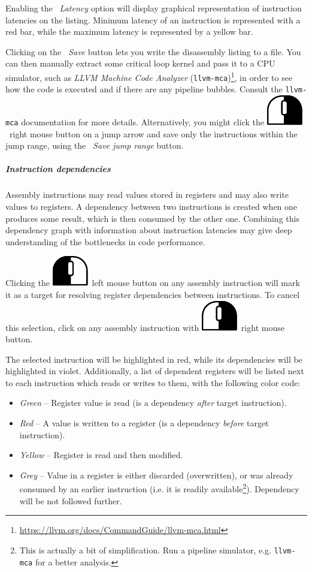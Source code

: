 \documentclass[hidelinks,titlepage,a4paper]{article}
\newcommand{\LMB}{\includegraphics[height=.8\baselineskip]{icons/lmb}}
\newcommand{\RMB}{\includegraphics[height=.8\baselineskip]{icons/rmb}}
\begin{document}
Enabling the \emph{\faTruckLoading{}~Latency} option will display graphical representation of instruction latencies on the listing. Minimum latency of an instruction is represented with a red bar, while the maximum latency is represented by a yellow bar.

Clicking on the \emph{\faFileImport{}~Save} button lets you write the disassembly listing to a file. You can then manually extract some critical loop kernel and pass it to a CPU simulator, such as \emph{LLVM Machine Code Analyzer} (\texttt{llvm-mca})\footnote{\url{https://llvm.org/docs/CommandGuide/llvm-mca.html}}, in order to see how the code is executed and if there are any pipeline bubbles. Consult the \texttt{llvm-mca} documentation for more details. Alternatively, you might click the \RMB{}~right mouse button on a jump arrow and save only the instructions within the jump range, using the \emph{\faFileImport{}~Save jump range} button.

\subparagraph{Instruction dependencies}

Assembly instructions may read values stored in registers and may also write values to registers. A dependency between two instructions is created when one produces some result, which is then consumed by the other one. Combining this dependency graph with information about instruction latencies may give deep understanding of the bottlenecks in code performance.

Clicking the \LMB{}~left mouse button on any assembly instruction will mark it as a target for resolving register dependencies between instructions. To cancel this selection, click on any assembly instruction with \RMB{}~right mouse button.

The selected instruction will be highlighted in red, while its dependencies will be highlighted in violet. Additionally, a list of dependent registers will be listed next to each instruction which reads or writes to them, with the following color code:

\begin{itemize}
\item \emph{Green} -- Register value is read (is a dependency \emph{after} target instruction).
\item \emph{Red} -- A value is written to a register (is a dependency \emph{before} target instruction).
\item \emph{Yellow} -- Register is read and then modified.
\item \emph{Grey} -- Value in a register is either discarded (overwritten), or was already consumed by an earlier instruction (i.e. it is readily available\footnote{This is actually a bit of simplification. Run a pipeline simulator, e.g. \texttt{llvm-mca} for a better analysis.}). Dependency will be not followed further.
\end{itemize}
\end{document}
